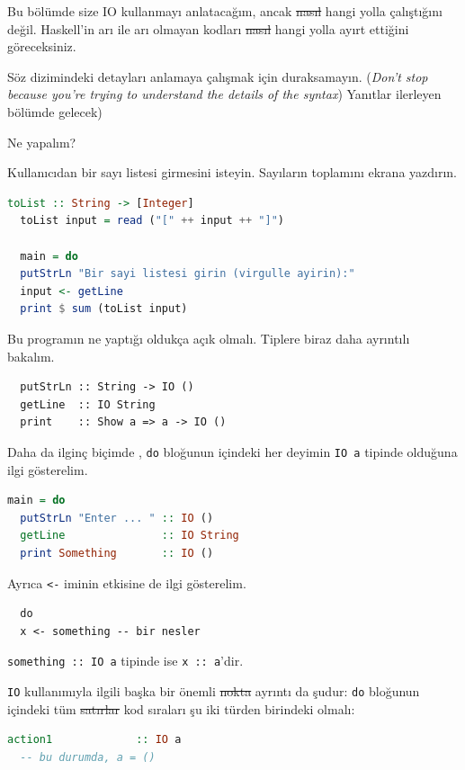 \documentclass[a4paper,14pt,openany]{extbook} %
\let\emph\textit
\begin{document}
Bu bölümde size IO kullanmayı anlatacağım, ancak \st{nasıl} hangi yolla çalıştığını değil.
Haskell'in arı ile arı olmayan kodları \st{nasıl} hangi yolla ayırt ettiğini göreceksiniz.

Söz dizimindeki detayları anlamaya çalışmak için duraksamayın. {(\small\emph{Don’t stop because you’re trying to understand the details of the syntax}) Yanıtlar ilerleyen bölümde gelecek)}

Ne yapalım?

Kullanıcıdan bir sayı listesi girmesini isteyin. Sayıların toplamını ekrana yazdırın.

\begin{lstlisting}[language=Haskell]
  toList :: String -> [Integer]
  toList input = read ("[" ++ input ++ "]")

  main = do
  putStrLn "Bir sayi listesi girin (virgulle ayirin):"
  input <- getLine
  print $ sum (toList input)
\end{lstlisting}

Bu programın ne yaptığı oldukça açık olmalı. Tiplere biraz daha
ayrıntılı bakalım.

\begin{lstlisting}
  putStrLn :: String -> IO ()
  getLine  :: IO String
  print    :: Show a => a -> IO ()
\end{lstlisting}

Daha da ilginç biçimde , \lstinline!do! bloğunun içindeki her deyimin
\lstinline!IO a! tipinde olduğuna ilgi gösterelim.

\begin{lstlisting}[language=Haskell]
  main = do
  putStrLn "Enter ... " :: IO ()
  getLine               :: IO String
  print Something       :: IO ()
\end{lstlisting}

Ayrıca \lstinline!<-! iminin etkisine de ilgi gösterelim.

\begin{lstlisting}
  do
  x <- something -- bir nesler
\end{lstlisting}

\lstinline!something :: IO a! tipinde ise \lstinline!x :: a!'dir.

\lstinline!IO! kullanımıyla ilgili başka bir önemli \st{nokta} ayrıntı da şudur:
\lstinline!do! bloğunun içindeki tüm \st{satırlar} kod sıraları şu iki türden birindeki
olmalı:

\begin{lstlisting}[language=Haskell]
  action1             :: IO a
  -- bu durumda, a = ()
\end{lstlisting}
\end{document}
